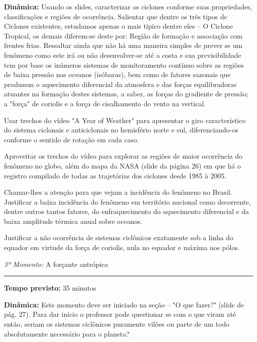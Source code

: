 \noindent\textbf{Dinâmica:} Usando os slides, caracterizar os ciclones conforme suas propriedades, classificações e regiões de ocorrência. Salientar que dentre os três tipos de Ciclones existentes, estudamos apenas o mais típico dentre eles -- O Ciclone Tropical, os demais diferem-se deste por: Região de formação e associação com frentes frias. Ressaltar ainda que não há uma maneira simples de prever se um fenômeno como este irá ou não desenvolver-se até a costa e sua previsibilidade tem por base os inúmeros sistemas de monitoramento contínuo sobre as regiões de baixa pressão nos oceanos (isóbaras), bem como de fatores sazonais que produzem o aquecimento diferencial da atmosfera e das forças equilibradoras atuantes na formação destes sistemas, a saber, as forças do gradiente de pressão; a "força" de coriolis e a força de cisalhamento do vento na vertical.

Usar trechos do vídeo "A Year of Weather" para apresentar o giro característico do sistema ciclonais e anticiclonais no hemisfério norte e sul, diferenciando-os conforme o sentido de rotação em cada caso.

Aproveitar os trechos do vídeo para explorar as regiões de maior ocorrência do fenômeno no globo, além do mapa da NASA (slide da página 26) em que há o registro compilado de todas as trajetórias dos ciclones desde 1985 à 2005.

Chamar-lhes a atenção para que vejam a incidência do fenômeno no Brasil. Justificar a baixa incidência do fenômeno em território nacional como decorrente, dentre outros tantos fatores, do enfraquecimento do aquecimento diferencial e da baixa amplitude térmica anual sobre oceanos.

Justificar a não ocorrência de sistemas ciclônicos exatamente sob a linha do equador em virtude da força de coriolis, nula no equador e máxima nos pólos.

\vspace{50pt}
\par\noindent\emph{3º Momento:} A forçante antrópica
\par\noindent\rule{.3\textwidth}{.5pt}
\par\noindent\textbf{Tempo previsto:} 35 minutos

\par\noindent\textbf{Dinâmica:} Este momento deve ser iniciado na seção -- "O que fazer?" (slide de pág. 27). Para dar início o professor pode questionar se com o que viram até então, seriam os sistemas ciclônicos puramente vilões ou parte de um todo absolutamente necessário para o planeta?

